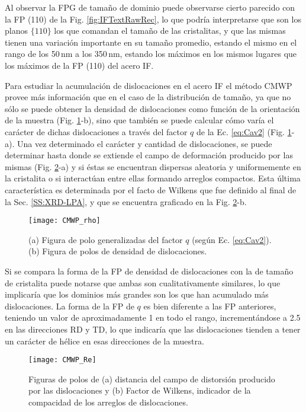 Al observar la FPG de tamaño de dominio puede observarse cierto parecido con la FP (110) de la Fig. \ref{fig:IFTextRawRec}, lo que podría interpretarse que son los planos $\{110\}$ los que comandan el tamaño de las cristalitas, y que las mismas tienen una variación importante en su tamaño promedio, estando el mismo en el rango de los 50\,nm a los 350\,nm, estando los máximos en los mismos lugares que los máximos de la FP (110) del acero IF.

Para estudiar la acumulación de dislocaciones en el acero IF el método CMWP provee más información que en el caso de la distribución de tamaño, ya que no sólo se puede obtener la densidad de dislocaciones como función de la orientación de la muestra (Fig. \ref{fig:IFCMWPrho}-b), sino que también se puede calcular cómo varía el carácter de dichas dislocaciones a través del factor $q$ de la Ec. \ref{eq:Cav2} (Fig. \ref{fig:IFCMWPrho}-a).
Una vez determinado el carácter y cantidad de dislocaciones, se puede determinar hasta donde se extiende el campo de deformación producido por las mismas (Fig. \ref{fig:IFCMWPRe}-a) y si éstas se encuentran dispersas aleatoria y uniformemente en la cristalita o si interactúan entre ellas formando arreglos compactos.
Esta última característica es determinada por el facto de Wilkens que fue definido al final de la Sec. \ref{SS:XRD-LPA}, y que se encuentra graficado en la Fig. \ref{fig:IFCMWPRe}-b.

\begin{figure}[!htb]
  \centering
  \texttt{[image: CMWP\_rho]}
  \caption{(a) Figura de polo generalizadas del factor $q$ (según Ec. \ref{eq:Cav2}). (b) Figura de polos de densidad de dislocaciones.}
  \label{fig:IFCMWPrho}
\end{figure}

Si se compara la forma de la FP de densidad de dislocaciones con la de tamaño de cristalita puede notarse que ambas son cualitativamente similares, lo que implicaría que los dominios más grandes son los que han acumulado más dislocaciones.
La forma de la FP de $q$ es bien diferente a las FP anteriores, teniendo un valor de aproximadamente 1 en todo el rango, incrementándose a 2.5 en las direcciones RD y TD, lo que indicaría que las dislocaciones tienden a tener un carácter de hélice en esas direcciones de la muestra.

\begin{figure}[!htb]
  \centering
  \texttt{[image: CMWP\_Re]}
  \caption{Figuras de polos de (a) distancia del campo de distorsión producido por las dislocaciones y (b) Factor de Wilkens, indicador de la compacidad de los arreglos de dislocaciones.}
  \label{fig:IFCMWPRe}
\end{figure}

